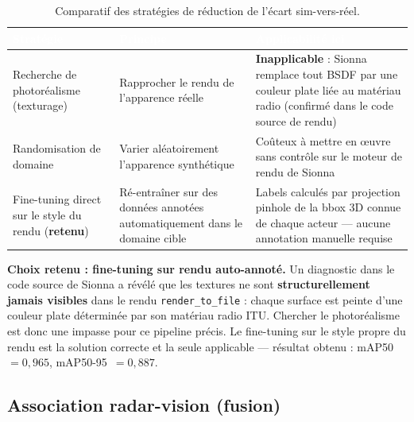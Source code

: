 \documentclass[12pt,a4paper,titlepage]{article}
\newcommand{\hd}[1]{\textcolor{white}{\textbf{#1}}}
\newcommand{\choix}{\rowcolor{tabchoice}}
\begin{document}
\begin{table}[H]
    \centering
    \caption{Comparatif des stratégies de réduction de l'écart sim-vers-réel.}
    \begin{tabularx}{\textwidth}{F{3.6cm}LL}
        \toprule
        \hd{Stratégie} & \hd{Principe} & \hd{Applicabilité ici} \\
        \midrule
        Recherche de photoréalisme (texturage) & Rapprocher le rendu de l'apparence réelle & \textbf{Inapplicable} : Sionna remplace tout BSDF par une couleur plate liée au matériau radio (confirmé dans le code source de rendu) \\
        Randomisation de domaine & Varier aléatoirement l'apparence synthétique & Coûteux à mettre en \oe uvre sans contrôle sur le moteur de rendu de Sionna \\
        \choix Fine-tuning direct sur le style du rendu (\textbf{retenu}) & Ré-entraîner sur des données annotées automatiquement dans le domaine cible & Labels calculés par projection pinhole de la bbox 3D connue de chaque acteur --- aucune annotation manuelle requise \\
        \bottomrule
    \end{tabularx}
\end{table}

\textbf{Choix retenu : fine-tuning sur rendu auto-annoté.} Un diagnostic dans le code source de Sionna a révélé que les textures ne sont \textbf{structurellement jamais visibles} dans le rendu \texttt{render\_to\_file} : chaque surface est peinte d'une couleur plate déterminée par son matériau radio ITU. Chercher le photoréalisme est donc une impasse pour ce pipeline précis. Le fine-tuning sur le style propre du rendu est la solution correcte et la seule applicable --- résultat obtenu : mAP50~$=0{,}965$, mAP50-95~$=0{,}887$.

\subsection{Association radar-vision (fusion)}
\label{subsec:choix_tech_fusion}
\end{document}
